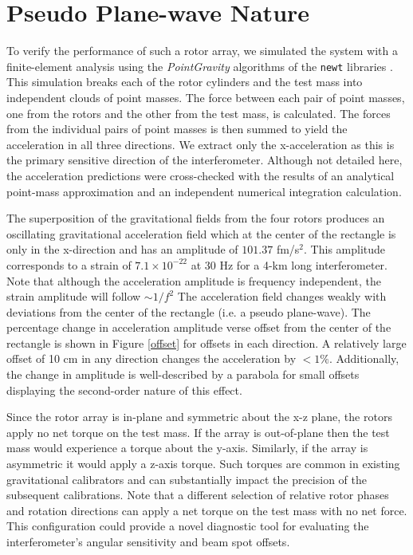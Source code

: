 \documentclass[superscriptaddress, twocolumn, prd]{revtex4-1}
\begin{document}
\section{Pseudo Plane-wave Nature}

To verify the performance of such a rotor array, we simulated the system with a finite-element analysis using the \textit{PointGravity} algorithms of the \texttt{newt} libraries \cite{Hagedorn, pgURL}. This simulation breaks each of the rotor cylinders and the test mass into independent clouds of point masses. The force between each pair of point masses, one from the rotors and the other from the test mass, is calculated. The forces from the individual pairs of point masses is then summed to yield the acceleration in all three directions. We extract only the x-acceleration as this is the primary sensitive direction of the interferometer. Although not detailed here, the acceleration predictions were cross-checked with the results of an analytical point-mass approximation\cite{ncal} and an independent  numerical integration calculation.

The superposition of the gravitational fields from the four rotors produces an oscillating gravitational acceleration field which at the center of the rectangle is only in the x-direction and has an amplitude of $101.37$ fm/s$^2$. This amplitude corresponds to a strain of $7.1\times10^{-22}$ at 30 Hz for a 4-km long interferometer. Note that although the acceleration amplitude is frequency independent, the strain amplitude will follow $\sim1/f^2$  The acceleration field changes weakly with deviations from the center of the rectangle (i.e. a pseudo plane-wave). The percentage change in acceleration amplitude verse offset from the center of the rectangle is shown in Figure \ref{offset} for offsets in each direction. A relatively large offset of 10 cm in any direction changes the acceleration by $<1\%$. Additionally, the change in amplitude is well-described by a parabola for small offsets displaying the second-order nature of this effect. 


Since the rotor array is in-plane and symmetric about the x-z plane, the rotors apply no net torque on the test mass. If the array is out-of-plane then the test mass would experience a torque about the y-axis. Similarly, if the array is asymmetric it would apply a z-axis torque. Such torques are common in existing gravitational calibrators and can substantially impact the precision of the subsequent calibrations. Note that a different selection of relative rotor phases and rotation directions can apply a net torque on the test mass with no net force. This configuration could provide a novel diagnostic tool for evaluating the interferometer's angular sensitivity and beam spot offsets.
\end{document}
